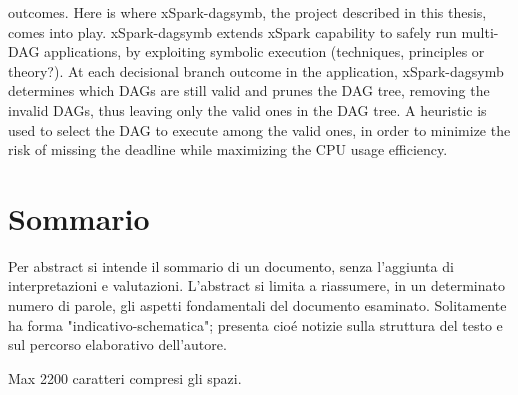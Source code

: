 outcomes. Here is where xSpark-dagsymb, the project described in this thesis, comes into play. xSpark-dagsymb extends xSpark capability to safely run multi-DAG applications, by exploiting symbolic execution (techniques, principles or theory?). At each decisional branch outcome in the application, xSpark-dagsymb determines which DAGs are still valid and prunes the DAG tree, removing the invalid DAGs, thus leaving only the valid ones in the DAG tree. A heuristic is used to select the DAG to execute among the valid ones, in order to minimize the risk of missing the deadline while maximizing the CPU usage efficiency.
\vfill
\newpage
{}
\chapter*{Sommario}
Per abstract si intende il sommario di un documento, senza l'aggiunta di interpretazioni e valutazioni. L'abstract si limita a riassumere, in un determinato numero di parole, gli aspetti fondamentali del documento esaminato. Solitamente ha forma "indicativo-schematica"; presenta cioé notizie sulla struttura del testo e sul percorso elaborativo dell'autore.

Max 2200 caratteri compresi gli spazi.

\endgroup